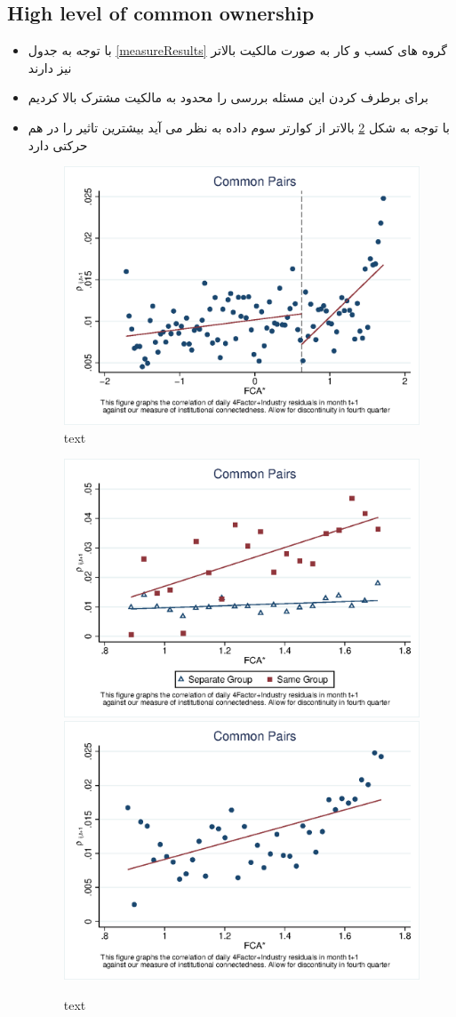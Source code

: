 \documentclass[12pt, a4paper]{article}
\begin{document}
%
\FloatBarrier



\subsection{High level of common ownership}
\begin{itemize}
	\item 
	با توجه به جدول 
	\ref{measureResults}
	گروه های کسب و کار به صورت مالکیت بالاتر نیز دارند 
	\item
	برای برطرف کردن این مسئله بررسی را محدود به مالکیت مشترک بالا کردیم
	\item
	با توجه به شکل 
	\ref{Qmcorr5subsample}
	بالاتر از کوارتر سوم داده به نظر می آید بیشترین تاثیر را در هم حرکتی دارد
	
	\begin{figure}[htbp]
		\centering  
		\includegraphics[width=0.6\linewidth]{"Output/Qmcorr5lrd.eps"}
		\caption{text}
		\label{Qmcorr5lrd}
	\end{figure}
	\begin{figure}[htbp]
		\centering  
		\includegraphics[width=0.45\linewidth]{"Output/Qmcorr5lrdbgsubsample.eps"}
		\includegraphics[width=0.45\linewidth]{"Output/Qmcorr5subsample.eps"}
		\caption{text}
		\label{Qmcorr5subsample}
	\end{figure}


\end{itemize}
\end{document}
